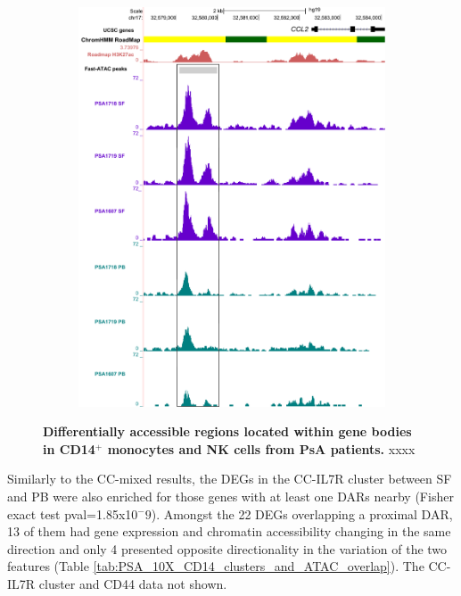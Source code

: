 \bigskip
\begin{figure}[H]
\centering
\begin{subfigure}[b]{0.60\textwidth}
\centering 
\includegraphics[width=\textwidth]{./Results3/pdfs/ATAC_PSA_CD14_UCSC_CCL2_track}
\caption{}
\end{subfigure}
\caption[Differentially accessible regions located within gene bodies in CD14$^+$ monocytes and NK cells from PsA patients.]{\textbf{Differentially accessible regions located within gene bodies in CD14$^+$ monocytes and NK cells from PsA patients.} xxxx}
\label{figure:PsA_10X_qPCR_ATAC_CD14_CCL2}
\end{figure}


Similarly to the CC-mixed results, the DEGs in the CC-IL7R cluster between SF and PB were also enriched for those genes with at least one DARs nearby (Fisher exact test pval=1.85x10$^-9$). Amongst the 22 DEGs overlapping a proximal DAR, 13 of them had gene expression and chromatin accessibility changing in the same direction and only 4 presented opposite directionality in the variation of the two features (Table \ref{tab:PSA_10X_CD14_clusters_and_ATAC_overlap}). The CC-IL7R cluster and CD44 data not shown.




